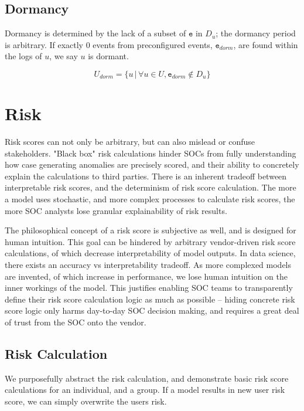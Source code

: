 \documentclass[10pt, titlepage, twocolumn]{report}
\begin{document}
\subsection{Dormancy}
Dormancy is determined by the lack of a subset of \(\texttt{e}\) in \(D_u\); the dormancy period is arbitrary. If exactly 0 events from preconfigured events, \(\texttt{e}_{dorm}\), are found within the logs of \(u\), we say \(u\) is dormant.

\begin{equation}
U_{dorm} = \{u \, \vert \, \forall u \in U, \texttt{e}_{dorm} \notin D_u \}
\end{equation}


\section{Risk}
Risk scores can not only be arbitrary, but can also mislead or confuse stakeholders. "Black box" risk calculations hinder SOCs from fully understanding how case generating anomalies are precisely scored, and their ability to concretely explain the calculations to third parties. There is an inherent tradeoff between interpretable risk scores, and the determinism of risk score calculation. The more a model uses stochastic, and more complex processes to calculate risk scores, the more SOC analysts lose granular explainability of risk results.

The philosophical concept of a risk score is subjective as well, and is designed for human intuition. This goal can be hindered by arbitrary vendor-driven risk score calculations, of which decrease interpretability of model outputs. In data science, there exists an accuracy vs interpretability tradeoff. As more complexed models are invented, of which increase in performance, we lose human intuition on the inner workings of the model. This justifies enabling SOC teams to transparently define their risk score calculation logic as much as possible -- hiding concrete risk score logic only harms day-to-day SOC decision making, and requires a great deal of trust from the SOC onto the vendor.

\subsection{Risk Calculation}
\hspace*{15pt}
We purposefully abstract the risk calculation, and demonstrate basic risk score calculations for an individual, and a group. If a model results in new user risk score, we can simply overwrite the users risk. 
\end{document}

